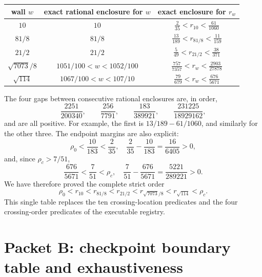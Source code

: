 \documentclass[11pt]{article}
\theoremstyle{definition}
\theoremstyle{remark}
\newcommand{\rhoc}{\rho_{c}}
\newcommand{\rhozero}{\rho_{0}}
\begin{document}
\begin{center}
\renewcommand{\arraystretch}{1.25}
\begin{tabular}{c|c|c}
wall \(w\)&exact rational enclosure for \(w\)&exact enclosure for \(r_w\)\\ \hline
\(10\)&\(10\)&\(\displaystyle \frac2{35}<r_{10}<\frac{61}{1060}\)\\[1mm]
\(81/8\)&\(81/8\)&\(\displaystyle \frac{13}{189}<r_{81/8}<\frac{11}{159}\)\\[1mm]
\(21/2\)&\(21/2\)&\(\displaystyle \frac5{49}<r_{21/2}<\frac{38}{371}\)\\[1mm]
\(\sqrt{7073}/8\)&\(1051/100<w<1052/100\)&
\(\displaystyle \frac{757}{7357}<r_w<\frac{2903}{27878}\)\\[1mm]
\(\sqrt{114}\)&\(1067/100<w<107/10\)&
\(\displaystyle \frac{79}{679}<r_w<\frac{676}{5671}\)
\end{tabular}
\end{center}

The four gaps between consecutive rational enclosures are, in order,
\begin{equation}
 \frac{2251}{200340},\qquad
 \frac{256}{7791},\qquad
 \frac{183}{389921},\qquad
 \frac{231225}{18929162},
 \label{eq:crossing-gaps}
\end{equation}
and are all positive.  For example, the first is
\(13/189-61/1060\), and similarly for the other three.  The endpoint
margins are also explicit:
\[
 \rhozero<\frac{10}{183}<\frac2{35},
 \quad
 \frac2{35}-\frac{10}{183}=\frac{16}{6405}>0,
\]
and, since \(\rhoc>7/51\),
\[
 \frac{676}{5671}<\frac7{51}<\rhoc,
 \quad
 \frac7{51}-\frac{676}{5671}=\frac{5221}{289221}>0.
\]
We have therefore proved the complete strict order
\begin{equation}
 \rhozero<r_{10}<r_{81/8}<r_{21/2}
 <r_{\sqrt{7073}/8}<r_{\sqrt{114}}<\rhoc.
 \label{eq:moving-order}
\end{equation}
This single table replaces the ten crossing-location predicates and the
four crossing-order predicates of the executable registry.

\section{Packet B: checkpoint boundary table and exhaustiveness}
\label{sec:checkpoint}
\end{document}
